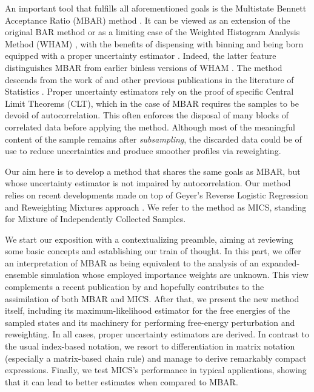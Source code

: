 \documentclass[
    journal=jctcce,
    layout=twocolumn
]{achemso}
\begin{document}
An important tool that fulfills all aforementioned goals is the Multistate Bennett Acceptance Ratio (MBAR) method \cite{Shirts_2008}. It can be viewed as an extension of the original BAR method \cite{Bennett_1976} or as a limiting case of the Weighted Histogram Analysis Method (WHAM) \cite{Ferrenberg_1989, *Kumar_1992}, with the benefits of dispensing with binning \cite{Tan_2012} and being born equipped with a proper uncertainty estimator \cite{Shirts_2008}. Indeed, the latter feature distinguishes MBAR from earlier binless versions of WHAM \cite{Bartels_2000, Souaille_2001}. The method descends from the work of \citeauthor{Kong_2003} \cite{Kong_2003} and other previous publications in the literature of Statistics \cite{Vardi_1985, Gill_1988, Geyer_1994, Lindsay_1995, Meng_1996}. Proper uncertainty estimators rely on the proof of specific Central Limit Theorems (CLT), which in the case of MBAR requires the samples to be devoid of autocorrelation. This often enforces the disposal of many blocks of correlated data before applying the method. Although most of the meaningful content of the sample remains after \textit{subsampling}, the discarded data could be of use to reduce uncertainties and produce smoother profiles via reweighting.

Our aim here is to develop a method that shares the same goals as MBAR, but whose uncertainty estimator is not impaired by autocorrelation. Our method relies on recent developments \cite{Flegal_2010, Buta_2010, Buta_2011, Doss_2014, Vats_2015, *Vats_2018, Tan_2015, Roy_2018} made on top of Geyer's Reverse Logistic Regression and Reweighting Mixtures  approach \cite{Geyer_1994}. We refer to the method as MICS, standing for Mixture of Independently Collected Samples.

We start our exposition with a contextualizing preamble, aiming at reviewing some basic concepts and establishing our train of thought. In this part, we offer an interpretation of MBAR as being equivalent to the analysis of an expanded-ensemble simulation \cite{Lyubartsev_1992} whose employed importance weights are unknown. This view complements a recent publication by \citeauthor{Shirts_2017} \cite{Shirts_2017} and hopefully contributes to the assimilation of both MBAR and MICS. After that, we present the new method itself, including its maximum-likelihood estimator for the free energies of the sampled states and its machinery for performing free-energy perturbation and reweighting. In all cases, proper uncertainty estimators are derived. In contrast to the usual index-based notation, we resort to differentiation in matrix notation (especially a matrix-based chain rule) and manage to derive remarkably compact expressions. Finally, we test MICS's performance in typical applications, showing that it can lead to better estimates when compared to MBAR.
\end{document}
